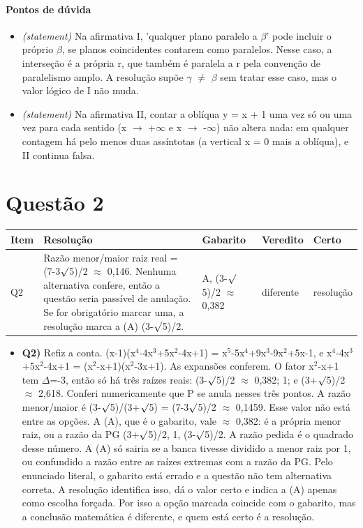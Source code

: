 \documentclass{article}%
\begin{document}
\paragraph{Pontos de dúvida}%
\begin{itemize}%
\item%
\textit{(statement)} Na afirmativa I, 'qualquer plano paralelo a $\beta$' pode incluir o próprio $\beta$, se planos coincidentes contarem como paralelos. Nesse caso, a interseção é a própria r, que também é paralela a r pela convenção de paralelismo amplo. A resolução supõe $\gamma$ $\neq$ $\beta$ sem tratar esse caso, mas o valor lógico de I não muda.%
\item%
\textit{(statement)} Na afirmativa II, contar a oblíqua y = x + 1 uma vez só ou uma vez para cada sentido (x $\to$ +$\infty$ e x $\to$ -$\infty$) não altera nada: em qualquer contagem há pelo menos duas assíntotas (a vertical x = 0 mais a oblíqua), e II continua falsa.%
\end{itemize}%
\section*{Questão 2}%
\begin{longtable}{@{}p{} p{} p{} p{} p{}@{}}\toprule Item & Resolução & Gabarito & Veredito & Certo \\ \midrule
Q2 & Razão menor/maior raiz real = (7-3$\surd$5)/2 $\approx$ 0,146. Nenhuma alternativa confere, então a questão seria passível de anulação. Se for obrigatório marcar uma, a resolução marca a (A) (3-$\surd$5)/2. & A, (3-$\surd$5)/2 $\approx$ 0,382 & diferente & resolução \\
\bottomrule\end{longtable}%
\begin{itemize}%
\item%
\textbf{Q2)} Refiz a conta. (x-1)(x$^{4}$-4x$^3$+5x$^2$-4x+1) = x$^{5}$-5x$^{4}$+9x$^3$-9x$^2$+5x-1, e x$^{4}$-4x$^3$+5x$^2$-4x+1 = (x$^2$-x+1)(x$^2$-3x+1). As expansões conferem. O fator x$^2$-x+1 tem $\Delta$=-3, então só há três raízes reais: (3-$\surd$5)/2 $\approx$ 0,382; 1; e (3+$\surd$5)/2 $\approx$ 2,618. Conferi numericamente que P se anula nesses três pontos. A razão menor/maior é (3-$\surd$5)/(3+$\surd$5) = (7-3$\surd$5)/2 $\approx$ 0,1459. Esse valor não está entre as opções. A (A), que é o gabarito, vale $\approx$ 0,382: é a própria menor raiz, ou a razão da PG (3+$\surd$5)/2, 1, (3-$\surd$5)/2. A razão pedida é o quadrado desse número. A (A) só sairia se a banca tivesse dividido a menor raiz por 1, ou confundido a razão entre as raízes extremas com a razão da PG. Pelo enunciado literal, o gabarito está errado e a questão não tem alternativa correta. A resolução identifica isso, dá o valor certo e indica a (A) apenas como escolha forçada. Por isso a opção marcada coincide com o gabarito, mas a conclusão matemática é diferente, e quem está certo é a resolução.%
\end{itemize}%
\end{document}
